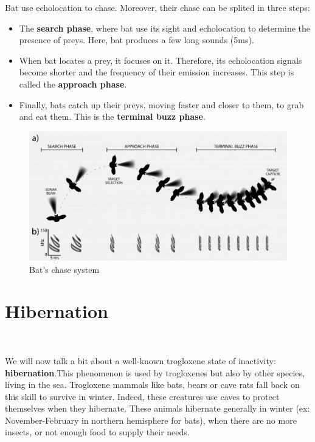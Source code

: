\documentclass[draft, final]{report}
\begin{document}
Bat use echolocation to chase. Moreover, their chase can be splited in three steps:
  \begin{itemize}
    \item The \textbf{search phase}, where bat use its sight and echolocation to determine the presence of preys. Here, bat produces a few long sounds (5ms).
    \item When bat locates a prey, it focuses on it. Therefore, its echolocation signals become shorter and the frequency of their emission increases. This step is called the \textbf{approach phase}.
    \item Finally, bats catch up their preys, moving faster and closer to them, to grab and eat them. This is the \textbf{terminal buzz phase}.
  \end{itemize}

  \begin{figure}[!ht]
    \centering
    \includegraphics[scale=1]{LateX/Images/batchase.png}
    \caption{Bat's chase system\cite{batchase}}
  \end{figure}

\clearpage

\section{Hibernation}
~\par
We will now talk a bit about a well-known trogloxene state of inactivity: \textbf{hibernation}.This phenomenon is used by trogloxenes but also by other species, living in the sea. Trogloxene mammals like bats, bears or cave rats fall back on this skill to survive in winter. Indeed, these creatures use caves to protect themselves when they hibernate. These animals hibernate generally in winter (ex: November-February in northern hemisphere for bats), when there are no more insects, or not enough food to supply their needs. \\
\end{document}
